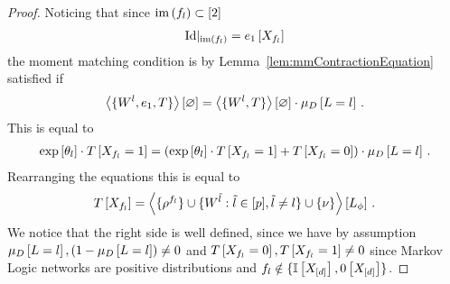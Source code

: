 \begin{proof}
	Noticing that since $\mathrm{im}\left(f_{l}\right)\subset[2]$
	\begin{align*}
		{\mathrm{Id}}|_{\mathrm{im}\left(f_{l}\right)} = e_{1}\left[X_{f_{l}}\right]
	\end{align*}
	the moment matching condition is by Lemma~\ref{lem:mmContractionEquation} satisfied if
	\begin{align*}
		\left\langle \{W^{l}, e_{1}, T\}\right\rangle \left[ \varnothing \right]
			= \left\langle \{W^{l},T\}\right\rangle \left[ \varnothing \right] \cdot \mu_{D}\left[L=l\right] \, . 
	\end{align*}
	This is equal to 
	\begin{align*}
		\mathrm{exp}\left[\theta_l\right] \cdot T\left[X_{f_{l}}=1\right]
		= \left( \mathrm{exp}\left[\theta_l\right] \cdot T\left[X_{f_{l}}=1\right] + T\left[X_{f_{l}}=0\right] \right) \cdot \mu_{D}\left[L=l\right] \, . 
	\end{align*}
	Rearranging the equations this is equal to 
	\begin{align*}
	 	T\left[X_{f_{l}}\right] 
		= \left\langle \{\rho^{f_{l}}\}
		\cup\{W^{\tilde{l}} : \tilde{l} \in [p], \tilde{l}\neq l\}
		\cup\{\nu\}\right\rangle \left[ L_\phi \right] \, . 
	\end{align*}
	We notice that the right side is well defined, since we have by assumption $\mu_{D}\left[L=l\right], (1- \mu_{D}\left[L=l\right]) \neq 0$ and $T\left[X_{f_{l}}=0\right], T\left[X_{f_{l}}=1\right] \neq 0$ since Markov Logic networks are positive distributions and $f_{l} \notin \{\mathbb{I}\left[X_{[d]}\right],0\left[X_{[d]}\right]\}$.
\end{proof}





